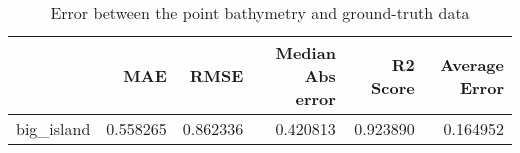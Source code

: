 \begin{table}[h!]
\caption{Error between the point bathymetry and ground-truth data}
\label{tab:big_island_lidar_error}
\begin{tabular}{lrrrrr}
\toprule
 & MAE & RMSE & Median Abs error & R2 Score & Average Error \\
\midrule
big_island & 0.558265 & 0.862336 & 0.420813 & 0.923890 & 0.164952 \\
\bottomrule
\end{tabular}
\end{table}
